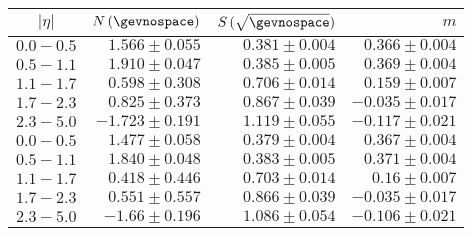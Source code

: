 \begin{table}[!ht]
  \caption{
  }
  \begin{center}
    \begin{tabular}{crrr}
      \toprule
      $|\eta|$ & $N\,(\gevnospace)$ & $S\,(\sqrt{\gevnospace})$ & $m$ \\
      \midrule
      $0.0 - 0.5$ & $1.566 \pm 0.055$ & $0.381 \pm 0.004$ & $0.366 \pm 0.004$ \\
      $0.5 - 1.1$ & $1.910 \pm 0.047$ & $0.385 \pm 0.005$ & $0.369 \pm 0.004$ \\
      $1.1 - 1.7$ & $0.598 \pm 0.308$ & $0.706 \pm 0.014$ & $0.159 \pm 0.007$ \\
      $1.7 - 2.3$ & $0.825 \pm 0.373$ & $0.867 \pm 0.039$ & $-0.035 \pm 0.017$ \\
      $2.3 - 5.0$ & $-1.723 \pm 0.191$ & $1.119 \pm 0.055$& $-0.117 \pm 0.021$ \\



      $0.0 - 0.5$ & $1.477 \pm 0.058$ & $0.379 \pm 0.004$ & $0.367 \pm 0.004$ \\
      $0.5 - 1.1$ & $1.840 \pm 0.048$ & $0.383 \pm 0.005$ & $0.371 \pm 0.004$ \\
      $1.1 - 1.7$ & $0.418 \pm 0.446$ & $0.703 \pm 0.014$ & $0.16 \pm 0.007$ \\
      $1.7 - 2.3$ & $0.551 \pm 0.557$ & $0.866 \pm 0.039$ & $-0.035 \pm 0.017$ \\
      $2.3 - 5.0$ & $-1.66 \pm 0.196$ & $1.086 \pm 0.054$ & $-0.106 \pm 0.021$ \\


\bottomrule
    \end{tabular}
  \end{center}
  \label{tab:App:Jets:MCTruthResolution}
\end{table}


